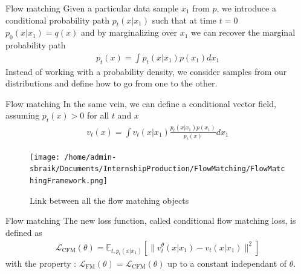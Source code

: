 \documentclass{beamer}
\begin{document}
\begin{frame}{Flow matching}
    Given a particular data sample \(x_1\) from \(p\), we introduce a conditional probability path \(p_t(x|x_1)\) such that at time \(t=0\) \(p_0(x|x_1)=q(x)\) and by marginalizing over \(x_1\) we can recover the marginal probability path 
    \begin{align}
        p_t(x)=\int p_t(x|x_1)p(x_1)dx_1
    \end{align}
    Instead of working with a probability density, we consider samples from our distributions and define how to go from one to the other.\\
\end{frame}
    
\begin{frame}{Flow matching}
    In the same vein, we can define a conditional vector field, assuming \(p_t(x)>0\) for all \(t\) and \(x\)
    \begin{align}
        v_t(x)=\int v_t(x|x_1)\frac{p_t(x|x_1)p(x_1)}{p_t(x)}dx_1
    \end{align}
\end{frame}

\begin{frame}
\begin{figure}
    \centering
    \texttt{[image: /home/admin-sbraik/Documents/InternshipProduction/FlowMatching/FlowMatchingFramework.png]}
    \caption{Link between all the flow matching objects}
    \label{fig:flow_matching_full}
\end{figure}
\end{frame}

\begin{frame}{Flow matching}
    The new loss function, called conditional flow matching loss, is defined as
    \begin{align}
        \mathcal{L}_\text{CFM}(\theta)=\mathbb{E}_{t,p_t(x|x_1)}\left[ \| v_t^\theta(x|x_1)-v_t(x|x_1)\|^2 \right]
    \end{align}
    with the property : \( \mathcal{L}_\text{FM}(\theta)=\mathcal{L}_\text{CFM}(\theta) \) up to a constant independant of \(\theta\).
\end{frame}
\end{document}
